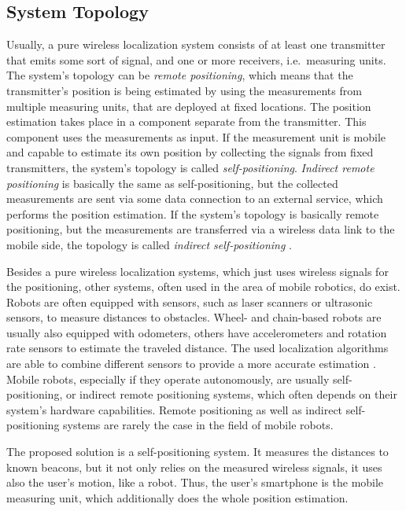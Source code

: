 \subsection{System Topology}
Usually, a pure wireless localization system consists of at least one transmitter that emits some sort of signal, and one or more receivers, i.e.\ measuring units. The system's topology can be \emph{remote positioning}, which means that the transmitter's position is being estimated by using the measurements from multiple measuring units, that are deployed at fixed locations. The position estimation takes place in a component separate from the transmitter. This component uses the measurements as input. If the measurement unit is mobile and capable to estimate its own position by collecting the signals from fixed transmitters, the system's topology is called \emph{self-positioning}. \emph{Indirect remote positioning} is basically the same as self-positioning, but the collected measurements are sent via some data connection to an external service, which performs the position estimation. If the system's topology is basically remote positioning, but the measurements are transferred via a wireless data link to the mobile side, the topology is called \emph{indirect self-positioning} \citep{IEEE:survey_wireless_indoor_pos}.

Besides a pure wireless localization systems, which just uses wireless signals for the positioning, other systems, often used in the area of mobile robotics, do exist. Robots are often equipped with sensors, such as laser scanners or ultrasonic sensors, to measure distances to obstacles. Wheel- and chain-based robots are usually also equipped with odometers, others have accelerometers and rotation rate sensors to estimate the traveled distance. The used localization algorithms are able to combine different sensors to provide a more accurate estimation \citep{thrun:prob_robo}. Mobile robots, especially if they operate autonomously, are usually self-positioning, or indirect remote positioning systems, which often depends on their system's hardware capabilities. Remote positioning as well as indirect self-positioning systems are rarely the case in the field of mobile robots.

The proposed solution is a self-positioning system. It measures the distances to known beacons, but it not only relies on the measured wireless signals, it uses also the user's motion, like a robot. Thus, the user's smartphone is the mobile measuring unit, which additionally does the whole position estimation.

